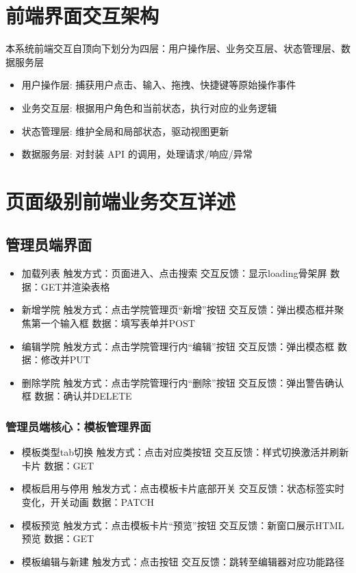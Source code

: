 \documentclass{article}
\begin{document}
	
\section{前端界面交互架构}
本系统前端交互自顶向下划分为四层：用户操作层、业务交互层、状态管理层、数据服务层
\begin{itemize}
	\item 用户操作层: 捕获用户点击、输入、拖拽、快捷键等原始操作事件
	\item 业务交互层: 根据用户角色和当前状态，执行对应的业务逻辑
	\item 状态管理层: 维护全局和局部状态，驱动视图更新
	\item 数据服务层: 对封装 API 的调用，处理请求/响应/异常
\end{itemize}
\section{页面级别前端业务交互详述}
\subsection{管理员端界面}
\begin{itemize}
	\item 加载列表 触发方式：页面进入、点击搜索 交互反馈：显示loading骨架屏 数据：GET并渲染表格
	\item 新增学院 触发方式：点击学院管理页“新增”按钮 交互反馈：弹出模态框并聚焦第一个输入框 数据：填写表单并POST
	\item 编辑学院 触发方式：点击学院管理行内“编辑”按钮 交互反馈：弹出模态框 数据：修改并PUT
	\item 删除学院 触发方式：点击学院管理行内“删除”按钮 交互反馈：弹出警告确认框 数据：确认并DELETE
\end{itemize}
\subsubsection{管理员端核心：模板管理界面}
\begin{itemize}
	\item 模板类型tab切换 触发方式：点击对应类按钮 交互反馈：样式切换激活并刷新卡片 数据：GET
	\item 模板启用与停用 触发方式：点击模板卡片底部开关 交互反馈：状态标签实时变化，开关动画 数据：PATCH
	\item 模板预览 触发方式：点击模板卡片“预览”按钮 交互反馈：新窗口展示HTML预览 数据：GET
	\item 模板编辑与新建 触发方式：点击按钮 交互反馈：跳转至编辑器对应功能路径
\end{itemize}
\end{document}
